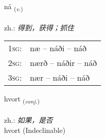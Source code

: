\documentclass[frontgrid, backgrid]{flacards}\usepackage[]{graphicx}\usepackage[]{xcolor}
\begin{document}
\renewcommand{\blhead}{\vskip5pt {\small\bfseries\footnotesize Sagnorð | 动词 }}
\renewcommand{\bcfoot}{\vskip5pt \hspace{2pt}{\small\bfseries\footnotesize 1K}}


{ná \small{\textsubscript{(\textit{v.})}} \\[1ex] %
\textphonetic{[nauː]} \\
zh.: \emph{得到，获得；抓住} \\  [2ex]
\renewcommand*{\arraystretch}{0.8}
\begin{tabular}{p{1cm}l}
\textsc{1sg}: & næ -- náði -- náð \\ 
\textsc{2sg}: & nærð -- náðir -- náð \\ 
\textsc{3sg}: & nær -- náði -- náð \\ 
\end{tabular}
}


\renewcommand{\flhead}{\vskip5pt \fboxsep=0pt {\small\bfseries\footnotesize Samtenging | 连词}}
\renewcommand{\fcfoot}{\vskip5pt \fboxsep=0pt \hspace{2pt}{\small\bfseries\footnotesize 1K}}

\renewcommand{\blhead}{\vskip5pt {\small\bfseries\footnotesize Samtenging | 连词 }}
\renewcommand{\bcfoot}{\vskip5pt \hspace{2pt}{\small\bfseries\footnotesize 1K}}


{hvort \small{\textsubscript{(\textit{conj.})}} \\[1ex]
\textphonetic{[kʰvɔr̥t]} \\
zh.: \emph{如果，是否} \\  [2ex]
hvort (Indeclinable)}

\renewcommand{\flhead}{\vskip5pt \fboxsep=0pt {\small\bfseries\footnotesize Lýsingarorð | 形容词}}
\renewcommand{\fcfoot}{\vskip5pt \fboxsep=0pt \hspace{2pt}{\small\bfseries\footnotesize 1K}}

\renewcommand{\blhead}{\vskip5pt {\small\bfseries\footnotesize Lýsingarorð | 形容词 }}
\renewcommand{\bcfoot}{\vskip5pt \hspace{2pt}{\small\bfseries\footnotesize 1K}}
\end{document}
